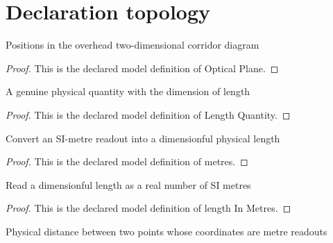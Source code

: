 \section{Declaration topology}
\begin{definition}
  \label{def:physics:phyx-mini-0162:phyxminiproblems-problemphyxmini0162-opticalplane}
  Positions in the overhead two-dimensional corridor diagram
\end{definition}
\begin{proof}
  This is the declared model definition of Optical Plane.
\end{proof}
\begin{definition}
  \label{def:physics:phyx-mini-0162:phyxminiproblems-problemphyxmini0162-lengthquantity}
  A genuine physical quantity with the dimension of length
\end{definition}
\begin{proof}
  This is the declared model definition of Length Quantity.
\end{proof}
\begin{definition}[metres]
  \label{def:physics:phyx-mini-0162:phyxminiproblems-problemphyxmini0162-metres}
  Convert an SI-metre readout into a dimensionful physical length
\end{definition}
\begin{proof}
  This is the declared model definition of metres.
\end{proof}
\begin{definition}
  \label{def:physics:phyx-mini-0162:phyxminiproblems-problemphyxmini0162-lengthinmetres}
  Read a dimensionful length as a real number of SI metres
\end{definition}
\begin{proof}
  This is the declared model definition of length In Metres.
\end{proof}
\begin{definition}
  \label{def:physics:phyx-mini-0162:phyxminiproblems-problemphyxmini0162-physicaldistance}
  Physical distance between two points whose coordinates are metre readouts
\end{definition}
